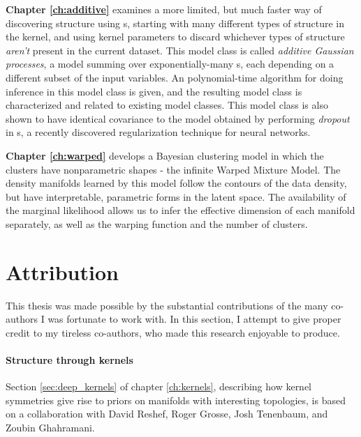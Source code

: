 {\bf Chapter \ref{ch:additive}} examines a more limited, but much faster way of discovering structure using \gp{}s, starting with many different types of structure in the kernel, and using kernel parameters to discard whichever types of structure \emph{aren't} present in the current dataset.
This model class is called \emph{additive Gaussian processes}, a model summing over exponentially-many \gp{}s, each depending on a different subset of the input variables.
An polynomial-time algorithm for doing inference in this model class is given, and the resulting model class is characterized and related to existing model classes.
This model class is also shown to have identical covariance to the model obtained by performing \emph{dropout} in \gp{}s, a recently discovered regularization technique for neural networks.

{\bf Chapter \ref{ch:warped}} develops a Bayesian clustering model in which the clusters have nonparametric shapes - the infinite Warped Mixture Model.
The density manifolds learned by this model follow the contours of the data density, but have interpretable, parametric forms in the latent space.
The availability of the marginal likelihood allows us to infer the effective dimension of each manifold separately, as well as the warping function and the number of clusters.




\section{Attribution}

This thesis was made possible by the substantial contributions of the many co-authors I was fortunate to work with.
In this section, I attempt to give proper credit to my tireless co-authors, who made this research enjoyable to produce.

\paragraph{Structure through kernels}
Section \ref{sec:deep_kernels} of chapter \ref{ch:kernels}, describing how kernel symmetries give rise to priors on manifolds with interesting topologies, is based on a collaboration with David Reshef, Roger Grosse, Josh Tenenbaum, and Zoubin Ghahramani.

